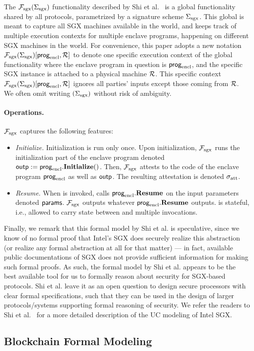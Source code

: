 The $\mathcal{F}_{\textrm{sgx}}({\Sigma_{\textrm{sgx}}})$ functionality described by Shi et al.~\cite{sgxsok} %
is a global functionality shared by all protocols, parametrized
by a signature scheme ${\Sigma_{\textrm{sgx}}}$.
This global \fsgx 
is meant to capture all SGX machines available in the world,
and keeps track of 
multiple execution contexts
for multiple enclave programs, happening on different SGX machines in the world.
For convenience, 
this paper adopts a new notation
$\mathcal{F}_{\textrm{sgx}}({\Sigma_{\textrm{sgx}}})[{\sf prog}_{\textrm{encl}}, \mathcal{R}]$
to denote 
one specific execution context of the global \fsgx
functionality where the enclave program in question is ${\sf prog}_{\textrm{encl}}$,
and the specific SGX instance is attached to a physical machine $\mathcal{R}$.
This specific context 
$\mathcal{F}_{\textrm{sgx}}({\Sigma_{\textrm{sgx}}})[{\sf prog}_{\textrm{encl}}, \mathcal{R}]$
ignores all parties' inputs except those coming from $\mathcal{R}$.
We often omit writing $({\Sigma_{\textrm{sgx}}})$ without risk of ambiguity.


\paragraph{Operations.}
$\mathcal{F}_{\textrm{sgx}}$ captures the following features:
\begin{itemize}[leftmargin=5mm]
\item
{\it Initialize.}
Initialization is run only once.
Upon initialization, $\mathcal{F}_{\textrm{sgx}}$
runs the initialization part of the enclave program
denoted ${\sf outp} := {\sf prog}_{\textrm{encl}}.{\bf Initialize}()$.
Then, $\mathcal{F}_{\textrm{sgx}}$ 
attests to the code of the enclave program ${\sf prog}_{\textrm{encl}}$ 
as well as ${\sf outp}$.
The resulting attestation is denoted 
${\sigma_{\textrm{att}}}$.
\item
{\it Resume.}
When  is invoked,
\fsgx 
calls ${\sf prog}_{\textrm{encl}}.{\bf Resume}$
on the input parameters denoted ${\sf params}$.
$\mathcal{F}_{\textrm{sgx}}$ 
outputs whatever ${\sf prog}_{\textrm{encl}}.{\bf Resume}$ outputs.
\fsgx is stateful, i.e., allowed to carry state
between  and multiple 
invocations.
\end{itemize}

Finally, we remark that this formal model by Shi et al.
is speculative,   
since we know of no formal
proof that Intel's SGX does securely realize this abstraction (or 
realize any formal
abstraction at all for that matter) --- 
in fact, available public documentations of SGX
does not provide sufficient information for making such formal proofs. 
As such, the formal model by Shi et al. 
appears to be the best available tool for us to 
formally reason about 
security 
for SGX-based protocols. 
Shi et al. leave it as an open question to design secure processors
with clear formal specifications, such that 
they can be used in the design of larger protocols/systems 
supporting formal reasoning of security.
We refer the readers to Shi et al.~\cite{sgxsok} 
for a more detailed description of the UC modeling of Intel SGX.


\subsection{Blockchain Formal Modeling}
\label{sec:blockchainmodel}



